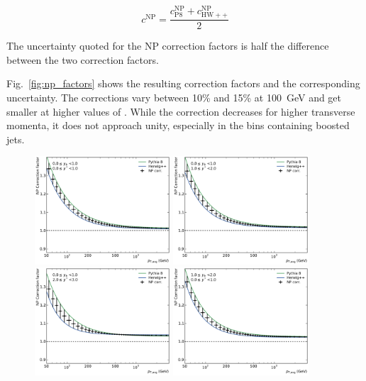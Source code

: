 \begin{equation*}
    c^\mathrm{NP} = \frac{c_{\mathrm{P8}}^{\mathrm{NP}} + c_{\mathrm{HW++}}^{\mathrm{NP}}}{2}
\end{equation*}

The uncertainty quoted for the NP correction factors is half the difference
between the two correction factors.

Fig.~\ref{fig:np_factors} shows the resulting correction factors and the
corresponding uncertainty. The corrections vary between 10\% and 15\% at
\SI{100}{\GeV} and get smaller at higher values of \ptavg. While the correction
decreases for higher transverse momenta, it does not approach unity, especially
in the bins containing boosted jets. 

\begin{figure}[htp]
    \centering
    \includegraphics[width=0.45\textwidth]{figures/theory/np_factors_calc_yb0ys0.pdf}\hfill
    \includegraphics[width=0.45\textwidth]{figures/theory/np_factors_calc_yb0ys1.pdf}
    \includegraphics[width=0.45\textwidth]{figures/theory/np_factors_calc_yb0ys2.pdf}\hfill
    \includegraphics[width=0.45\textwidth]{figures/theory/np_factors_calc_yb1ys0.pdf}

\end{figure}
